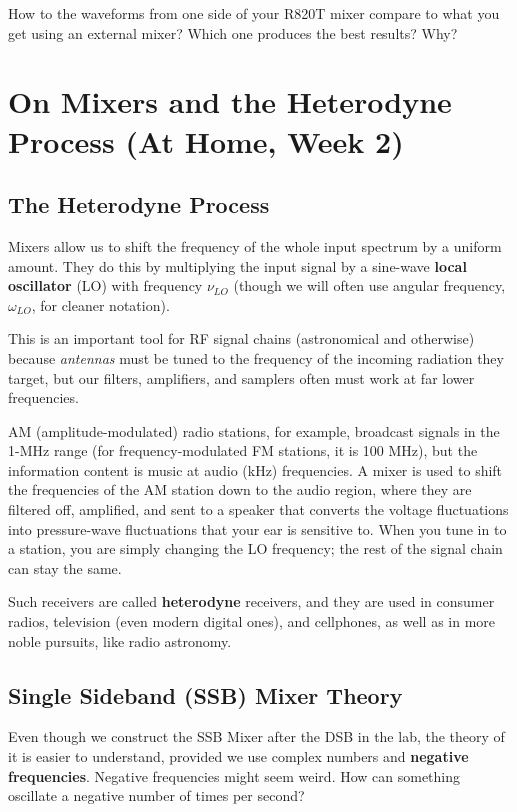 \documentclass[11pt,preprint]{aastex}
\begin{document}
How to the waveforms from one side of your R820T mixer compare to
what you get using an external mixer? Which one produces the best
results? Why?


\section {On Mixers and the Heterodyne
  Process (At Home, Week 2)} \label{hetereo}

%
\subsection{The Heterodyne Process}
%
\noindent
Mixers allow us to shift the frequency of the
whole input spectrum by a uniform amount.  They do this by multiplying
the input signal by a sine-wave {\bf local oscillator} (LO) with frequency
$\nu_{LO}$ (though we will often use
angular frequency, $\omega_{LO}$, for cleaner notation).

This is an important tool for RF signal chains (astronomical and otherwise)
because {\it antennas} must be tuned to the frequency of the incoming radiation they
target, but our filters, amplifiers, and samplers often must work at far lower
frequencies.

AM (amplitude-modulated) radio stations, for example, broadcast signals in the 1-MHz
range (for frequency-modulated FM stations, it is 100 MHz), but the information content
is music at audio (kHz) frequencies.
A mixer is used to shift the frequencies of
the AM station down to the audio region, where they are filtered off, amplified, and
sent to a speaker that converts the voltage fluctuations into pressure-wave fluctuations
that your ear is sensitive to.  When you tune in to a station, you are simply changing
the LO frequency; the rest of the signal chain can stay the same.

Such receivers are called {\bf heterodyne} receivers, and they are used 
in consumer radios, television (even modern digital ones), and cellphones, as well
as in more noble pursuits, like radio astronomy.
%
\subsection{Single Sideband (SSB) Mixer Theory}

\noindent
Even though we construct the SSB Mixer after the DSB in the lab, the theory of it
is easier to understand, provided we use
complex numbers and {\bf negative frequencies}.
Negative frequencies might seem weird. How can something oscillate
a negative number of times per second?
\end{document}
